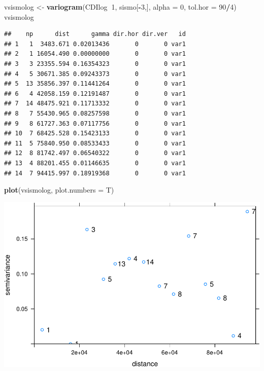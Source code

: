 \documentclass[11pt,]{article}
\newenvironment{Shaded}{\begin{snugshade}}{\end{snugshade}}
\newcommand{\KeywordTok}[1]{\textcolor[rgb]{0.13,0.29,0.53}{\textbf{#1}}}
\newcommand{\DataTypeTok}[1]{\textcolor[rgb]{0.13,0.29,0.53}{#1}}
\newcommand{\DecValTok}[1]{\textcolor[rgb]{0.00,0.00,0.81}{#1}}
\newcommand{\StringTok}[1]{\textcolor[rgb]{0.31,0.60,0.02}{#1}}
\newcommand{\OperatorTok}[1]{\textcolor[rgb]{0.81,0.36,0.00}{\textbf{#1}}}
\newcommand{\NormalTok}[1]{#1}
\begin{document}
\begin{Shaded}
\begin{Highlighting}[]
\NormalTok{vsismolog <-}\StringTok{ }\KeywordTok{variogram}\NormalTok{(CDIlog}\OperatorTok{~}\DecValTok{1}\NormalTok{, sismo[}\OperatorTok{-}\DecValTok{3}\NormalTok{,], }\DataTypeTok{alpha =} \DecValTok{0}\NormalTok{, }\DataTypeTok{tol.hor =} \DecValTok{90}\OperatorTok{/}\DecValTok{4}\NormalTok{)}
\NormalTok{vsismolog}
\end{Highlighting}
\end{Shaded}

\begin{verbatim}
##    np      dist      gamma dir.hor dir.ver   id
## 1   1  3483.671 0.02013436       0       0 var1
## 2   1 16054.490 0.00000000       0       0 var1
## 3   3 23355.594 0.16354323       0       0 var1
## 4   5 30671.385 0.09243373       0       0 var1
## 5  13 35856.397 0.11441264       0       0 var1
## 6   4 42058.159 0.12191487       0       0 var1
## 7  14 48475.921 0.11713332       0       0 var1
## 8   7 55430.965 0.08257598       0       0 var1
## 9   8 61727.363 0.07117756       0       0 var1
## 10  7 68425.528 0.15423133       0       0 var1
## 11  5 75840.950 0.08533433       0       0 var1
## 12  8 81742.497 0.06540322       0       0 var1
## 13  4 88201.455 0.01146635       0       0 var1
## 14  7 94415.997 0.18919368       0       0 var1
\end{verbatim}

\begin{Shaded}
\begin{Highlighting}[]
\KeywordTok{plot}\NormalTok{(vsismolog, }\DataTypeTok{plot.numbers =}\NormalTok{ T)}
\end{Highlighting}
\end{Shaded}

\includegraphics{proyecto_files/figure-latex/unnamed-chunk-25-3.pdf}
\end{document}
